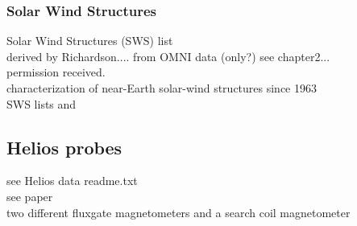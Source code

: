 \subsubsection{Solar Wind Structures}
Solar Wind Structures (SWS) list\\
derived by Richardson.... from OMNI data (only?)
see chapter2...\\

permission received.\\

characterization of near-Earth solar-wind structures since 1963\\
SWS lists \citep{Richardson2000} and \citep{Richardson2012}


\subsection{Helios probes}
\label{sec:helios_probes}

see Helios data readme.txt\\
see paper\\

two different fluxgate magnetometers and a search coil magnetometer\\

